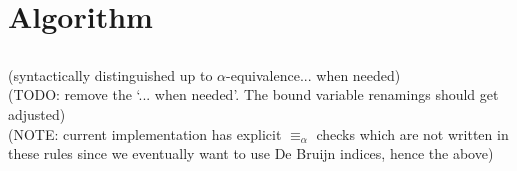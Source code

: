 \documentclass[11pt]{article}
\newcounter{counter}
\newcommand*{\hyph}{\text{-}}
\renewcommand*{\rule}[1][(\thecounter)\refstepcounter{counter}]{\inferrule*[vcenter,rightstyle=\texttt,right=$\mathtt{#1}$]}
\begin{document}
    \subsection*{}
        \begin{minipage}{\textwidth}
        \end{minipage}
    \subsection*{}
        \begin{minipage}{\textwidth}
        \end{minipage}
\section{Algorithm}
    \subsection*{}
    (syntactically distinguished up to $\alpha$-equivalence... when needed) \\
    (TODO: remove the `... when needed'. The bound variable renamings should get adjusted) \\
    (NOTE: current implementation has explicit $\equiv_\alpha$ checks which are not written in these rules since we eventually want to use De Bruijn indices, hence the above)
\end{document}
